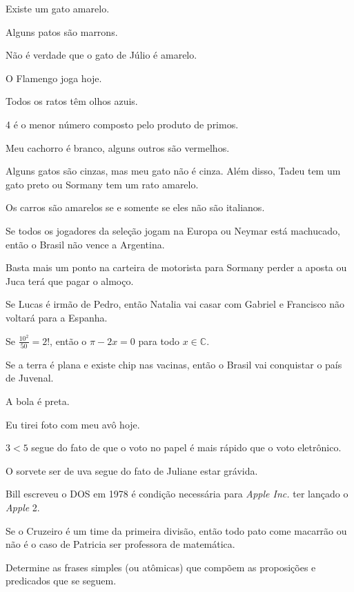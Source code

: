\begin{exerList}
 \item Existe um gato amarelo.
 \item Alguns patos são marrons.
 \item Não é verdade que o gato de Júlio é amarelo.
 \item O Flamengo joga hoje.
 \item Todos os ratos têm olhos azuis.
 \item 4 é o menor número composto pelo produto de primos.
 \item Meu cachorro é branco, alguns outros são vermelhos.
 \item Alguns gatos são cinzas, mas meu gato não é cinza. Além disso, Tadeu tem um gato preto ou Sormany tem um rato amarelo.
 \item Os carros são amarelos se e somente se eles não são italianos.
 \item Se todos os jogadores da seleção jogam na Europa ou Neymar está machucado, então o Brasil não vence a Argentina.
 \item Basta mais um ponto na carteira de motorista para Sormany perder a aposta ou Juca terá que pagar o almoço.
 \item Se Lucas é irmão de Pedro, então Natalia vai casar com Gabriel e Francisco não voltará para a Espanha.
 \item Se $\frac{10^2}{50} = 2!$, então o $\pi - 2x = 0$ para todo $x \in \mathbb{C}$.
 \item Se a terra é plana e existe chip nas vacinas, então o Brasil vai conquistar o país de Juvenal.
 \item A bola é preta.
 \item Eu tirei foto com meu avô hoje.
 \item $3 < 5$ segue do fato de que o voto no papel é mais rápido que o voto eletrônico.
 \item O sorvete ser de uva segue do fato de Juliane estar grávida.
 \item Bill escreveu o DOS em 1978 é condição necessária para \textit{Apple Inc.} ter lançado o \textit{Apple} 2.
 \item Se o Cruzeiro é um time da primeira divisão, então todo pato come macarrão ou não é o caso de Patricia ser professora de matemática.
\end{exerList}

\begin{questao}
 Determine as frases simples (ou atômicas) que compõem as proposições e predicados que se seguem.
\end{questao}

